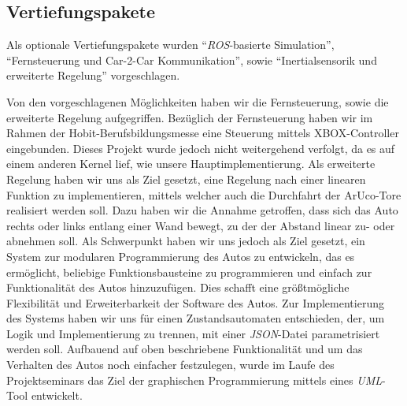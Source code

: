 \subsection{Vertiefungspakete}
Als optionale Vertiefungspakete wurden "`\textit{ROS}-basierte Simulation"', "`Fernsteuerung und Car-2-Car Kommunikation"', sowie "`Inertialsensorik und erweiterte Regelung"' vorgeschlagen.

Von den vorgeschlagenen Möglichkeiten haben wir die Fernsteuerung, sowie die erweiterte Regelung aufgegriffen. Bezüglich der Fernsteuerung haben wir im Rahmen der Hobit-Berufsbildungsmesse eine Steuerung mittels XBOX-Controller eingebunden. Dieses Projekt wurde jedoch nicht weitergehend verfolgt, da es auf einem anderen Kernel lief, wie unsere Hauptimplementierung. 
Als erweiterte Regelung haben wir uns als Ziel gesetzt, eine Regelung nach einer linearen Funktion zu implementieren, mittels welcher auch die Durchfahrt der ArUco-Tore realisiert werden soll. Dazu haben wir die Annahme getroffen, dass sich das Auto rechts oder links entlang einer Wand bewegt, zu der der Abstand linear zu- oder abnehmen soll. 
\newline
Als Schwerpunkt haben wir uns jedoch als Ziel gesetzt, ein System zur modularen Programmierung des Autos zu entwickeln, das es ermöglicht, beliebige Funktionsbausteine zu programmieren und einfach zur Funktionalität des Autos hinzuzufügen. Dies schafft eine größtmögliche Flexibilität und Erweiterbarkeit der Software des Autos. 
Zur Implementierung des Systems haben wir uns für einen Zustandsautomaten entschieden, der, um Logik und Implementierung zu trennen, mit einer \textit{JSON}-Datei parametrisiert werden soll. 
Aufbauend auf oben beschriebene Funktionalität und um das Verhalten des Autos noch einfacher festzulegen, wurde im Laufe des Projektseminars das Ziel der graphischen Programmierung mittels eines \textit{UML}-Tool entwickelt.